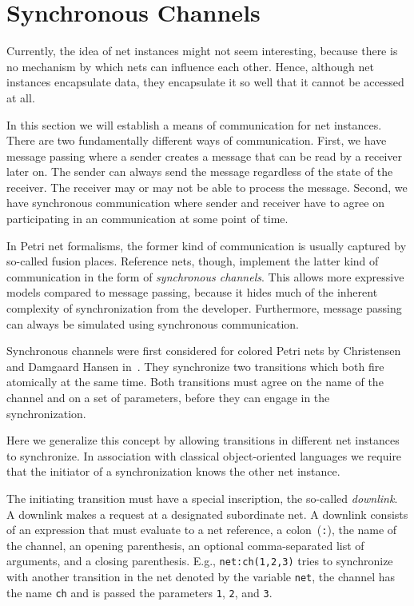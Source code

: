\section{Synchronous Channels}
\label{sec:channels}

Currently, the idea of net instances might not seem interesting, because
there is no mechanism by which nets can influence each other.
Hence, although net instances encapsulate data, they encapsulate it
so well that it cannot be accessed at all.


In this section we will establish a means of communication for net
instances. There are two fundamentally different ways of communication.
First, we have message passing where a sender creates a message that can be
read by a receiver later on. The sender can always send the message
regardless of the state of the receiver. The receiver may or may not
be able to process the message.
Second, we have synchronous communication where sender and receiver
have to agree on participating in an communication at some point of
time.

In Petri net formalisms, the former kind of communication is usually
captured by so-called fusion places.
Reference nets, though, implement the latter kind of communication
in the form of \emph{synchronous channels}.
This allows more expressive models compared to message passing,
because it hides much of the inherent complexity
of synchronization from the developer.
Furthermore, message passing can
always be simulated using synchronous communication.

Synchronous channels were first considered for colored Petri nets
by Christensen and Damgaard Hansen in~\cite{CDH92}. They synchronize
two transitions which both fire atomically at the same time.
Both transitions must agree on the name of the channel and on
a set of parameters, before they can engage in the synchronization.

Here we generalize this concept by allowing transitions
in different net instances to synchronize. In association with classical
object-oriented languages we require that the initiator
of a synchronization knows the other net instance.

The initiating transition must have a special inscription, the
so-called \emph{downlink}. A downlink makes a request at
a designated subordinate net. A downlink consists of an expression
that must evaluate to a net reference, a colon~(\texttt{:}),
the name of the channel, an opening parenthesis, an optional
comma-separated list of arguments, and a closing parenthesis.
E.g., \texttt{net:ch(1,2,3)} tries to synchronize with another transition
in the net denoted by the variable \texttt{net},
the channel has the name \texttt{ch} and is passed the parameters \texttt{1},
\texttt{2}, and \texttt{3}.

